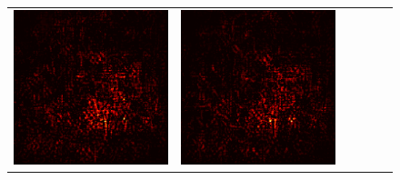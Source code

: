 \documentclass[preprint,12pt]{elsarticle}
\begin{document}
\begin{figure}[ht]
\begin{tabular}{cccccc}
  \includegraphics[scale=\scale]{../visualizations/examples/imagenette/resnet18/active_saliency_map/1.png} & 
  \includegraphics[scale=\scale]{../visualizations/examples/imagenette/resnet18/inactive_saliency_map/1.png} \\
  

\end{tabular}
\end{figure}
\end{document}
